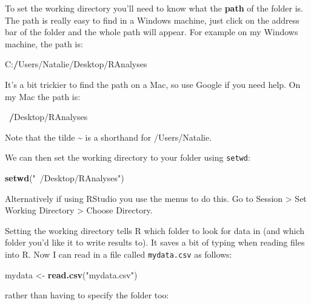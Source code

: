\documentclass[]{book}
\newenvironment{Shaded}{\begin{snugshade}}{\end{snugshade}}
\newcommand{\KeywordTok}[1]{\textcolor[rgb]{0.13,0.29,0.53}{\textbf{{#1}}}}
\newcommand{\StringTok}[1]{\textcolor[rgb]{0.31,0.60,0.02}{{#1}}}
\newcommand{\ErrorTok}[1]{\textcolor[rgb]{0.64,0.00,0.00}{\textbf{{#1}}}}
\newcommand{\NormalTok}[1]{{#1}}
\theoremstyle{definition}
\theoremstyle{definition}
\theoremstyle{definition}
\theoremstyle{remark}
\begin{document}
To set the working directory you'll need to know what the \textbf{path}
of the folder is. The path is really easy to find in a Windows machine,
just click on the address bar of the folder and the whole path will
appear. For example on my Windows machine, the path is:

\begin{Shaded}
\begin{Highlighting}[]
\NormalTok{C:}\ErrorTok{/}\NormalTok{Users/Natalie/Desktop/RAnalyses}
\end{Highlighting}
\end{Shaded}

It's a bit trickier to find the path on a Mac, so use Google if you need
help. On my Mac the path is:

\begin{Shaded}
\begin{Highlighting}[]
\NormalTok{~}\ErrorTok{/}\NormalTok{Desktop/RAnalyses}
\end{Highlighting}
\end{Shaded}

Note that the tilde \textasciitilde{} is a shorthand for /Users/Natalie.

We can then set the working directory to your folder using
\texttt{setwd}:

\begin{Shaded}
\begin{Highlighting}[]
\KeywordTok{setwd}\NormalTok{(}\StringTok{"~/Desktop/RAnalyses"}\NormalTok{)}
\end{Highlighting}
\end{Shaded}

Alternatively if using RStudio you use the menus to do this. Go to
Session \textgreater{} Set Working Directory \textgreater{} Choose
Directory.

Setting the working directory tells R which folder to look for data in
(and which folder you'd like it to write results to). It saves a bit of
typing when reading files into R. Now I can read in a file called
\texttt{mydata.csv} as follows:

\begin{Shaded}
\begin{Highlighting}[]
\NormalTok{mydata <-}\StringTok{ }\KeywordTok{read.csv}\NormalTok{(}\StringTok{"mydata.csv"}\NormalTok{)}
\end{Highlighting}
\end{Shaded}

rather than having to specify the folder too:
\end{document}
